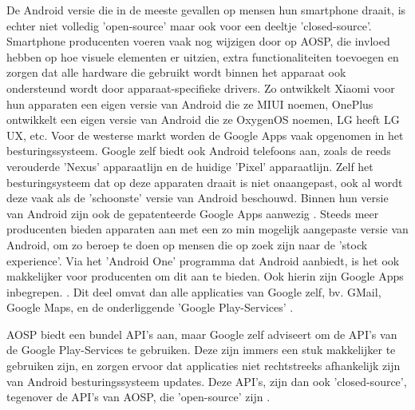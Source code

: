 De Android versie die in de meeste gevallen op mensen hun smartphone draait, is echter niet volledig 'open-source' maar ook voor een deeltje 'closed-source'. Smartphone producenten voeren vaak nog wijzigen door op AOSP, die invloed hebben op hoe visuele elementen er uitzien, extra functionaliteiten toevoegen en zorgen dat alle hardware die gebruikt wordt binnen het apparaat ook ondersteund wordt door apparaat-specifieke drivers. Zo ontwikkelt Xiaomi voor hun apparaten een eigen versie van Android die ze MIUI noemen, OnePlus ontwikkelt een eigen versie van Android die ze OxygenOS noemen, LG heeft LG UX, etc. Voor de westerse markt worden de Google Apps vaak opgenomen in het besturingssysteem. Google zelf biedt ook Android telefoons aan, zoals de reeds verouderde 'Nexus' apparaatlijn en de huidige 'Pixel' apparaatlijn. Zelf het besturingsysteem dat op deze apparaten draait is niet onaangepast, ook al wordt deze vaak als de 'schoonste' versie van Android beschouwd. Binnen hun versie van Android zijn ook de gepatenteerde Google Apps aanwezig \autocite{torres_stockandroid}. Steeds meer producenten bieden apparaten aan met een zo min mogelijk aangepaste versie van Android, om zo beroep te doen op mensen die op zoek zijn naar de 'stock experience'. Via het 'Android One' programma dat Android aanbiedt, is het ook makkelijker voor producenten om dit aan te bieden. Ook hierin zijn Google Apps inbegrepen. \autocite{android_androidone}.  Dit deel omvat dan alle applicaties van Google zelf, bv. GMail, Google Maps, en de onderliggende 'Google Play-Services' \autocite{amadeo_open-source}.

AOSP biedt een bundel API's  aan, maar Google zelf adviseert om de API's van de Google Play-Services te gebruiken. Deze zijn immers een stuk makkelijker te gebruiken zijn, en zorgen ervoor dat applicaties niet rechtstreeks afhankelijk zijn van Android besturingssysteem updates. Deze API's, zijn dan ook 'closed-source', tegenover de API's van AOSP, die 'open-source' zijn \autocite{marshall_google-play-services} . 

